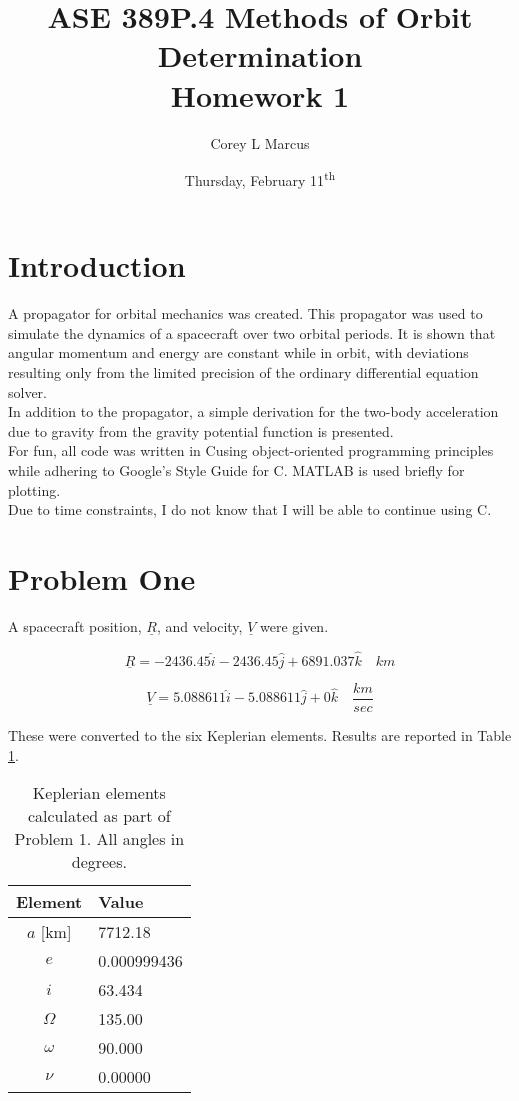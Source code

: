 \documentclass[11pt]{article}
\title{ASE 389P.4 Methods of Orbit Determination \\ Homework 1}
\author{Corey L Marcus} \date{Thursday, February 11\textsuperscript{th}}
\def\CC{{C\nolinebreak[4]\hspace{-.05em}\raisebox{.4ex}{\tiny\bf ++}}}
\begin{document}
\onehalfspace
\maketitle


\section{Introduction}

A propagator for orbital mechanics was created. This propagator was used to simulate the dynamics of a spacecraft over two orbital periods. It is shown that angular momentum and energy are constant while in orbit, with deviations resulting only from the limited precision of the ordinary differential equation solver. \\

In addition to the propagator, a simple derivation for the two-body acceleration due to gravity from the gravity potential function is presented. \\

For fun, all code was written in \CC using object-oriented programming principles while adhering to Google's Style Guide for \CC. MATLAB is used briefly for plotting. \\

Due to time constraints, I do not know that I will be able to continue using \CC. 

\section{Problem One}

A spacecraft position, $\underline{R}$, and velocity, $\underline{V}$ were given.

\begin{equation}
	\label{eq:pos1}
	\underline{R} = -2436.45\hat{i} - 2436.45\hat{j} + 6891.037\hat{k} \quad km
\end{equation}

\begin{equation}
\label{eq:vel1}
\underline{V} = 5.088611\hat{i} - 5.088611\hat{j} + 0\hat{k} \quad \frac{km}{sec}
\end{equation}

These were converted to the six Keplerian elements. Results are reported in Table \ref{tb:kepler}.

\begin{table}[ht!]
	\centering
	\begin{tabular}{c|l}
		Element  & Value \\ \hline
		$a$ [km]      &    7712.18   \\
		$e$      &   0.000999436    \\
		$i$      &   63.434    \\
		$\Omega$ &   135.00    \\
		$\omega$ &   90.000    \\
		$\nu$    &   0.00000   
	\end{tabular}
	\caption{Keplerian elements calculated as part of Problem 1. All angles in degrees.}
	\label{tb:kepler}
\end{table}
\end{document}
